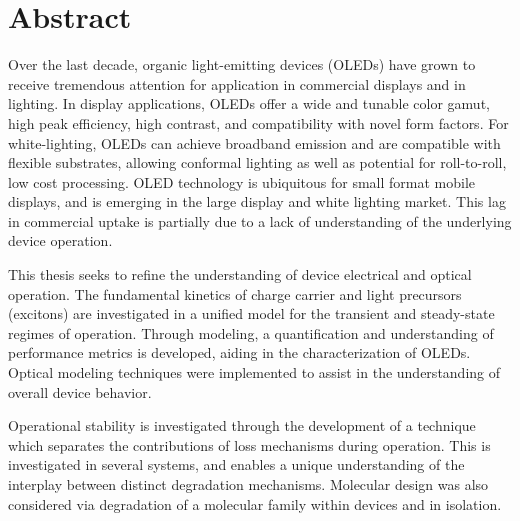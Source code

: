 \documentclass[../thesis.tex]{subfiles}
\begin{document}
\section*{Abstract}

Over the last decade, organic light-emitting devices (OLEDs) have grown to receive tremendous attention for application in commercial displays and in lighting.  
In display applications, OLEDs offer a wide and tunable color gamut, high peak efficiency, high contrast, and compatibility with novel form factors.
For white-lighting, OLEDs can achieve broadband emission and are compatible with flexible substrates, allowing conformal lighting as well as potential for roll-to-roll, low cost processing.
OLED technology is ubiquitous for small format mobile displays, and is emerging in the large display and white lighting market.
This lag in commercial uptake is partially due to a lack of understanding of the underlying device operation.

This thesis seeks to refine the understanding of device electrical and optical operation.
The fundamental kinetics of charge carrier and light precursors (excitons) are investigated in a unified model for the transient and steady-state regimes of operation.
Through modeling, a quantification and understanding of performance metrics is developed, aiding in the characterization of OLEDs.
Optical modeling techniques were implemented to assist in the understanding of overall device behavior.

Operational stability is investigated through the development of a technique which separates the contributions of loss mechanisms during operation.
This is investigated in several systems, and enables a unique understanding of the interplay between distinct degradation mechanisms.
Molecular design was also considered via degradation of a molecular family within devices and in isolation.


\pagebreak
\end{document}
